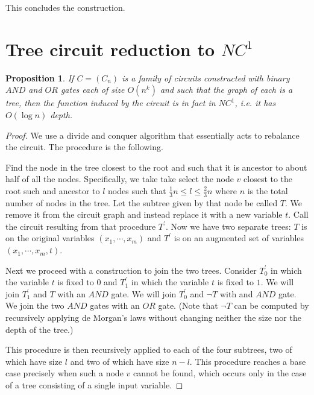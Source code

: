 \documentclass[11pt,letterpaper]{article}
\newtheorem{proposition}{Proposition}
\begin{document}
This concludes the construction.

\section{Tree circuit reduction to $NC^1$}

\begin{proposition}
    If $C = (C_n)$ is a family of circuits constructed with binary $AND$ and
    $OR$ gates each of size $O(n^k)$ and such that the graph of each is a tree,
    then the function induced by the circuit is in fact in $NC^1$, i.e. it has
    $O(\log n)$ depth.
\end{proposition}

\begin{proof}
    We use a divide and conquer algorithm that essentially acts to rebalance
    the circuit. The procedure is the following.

    Find the node in the tree closest to the root and such that it is ancestor
    to about half of all the nodes. Specifically, we take take select the node
    $v$ closest to the root such and ancestor to $l$ nodes such that
    $\frac{1}{3}n \leq l \leq \frac{2}{3}n$ where $n$ is the total number of
    nodes in the tree. Let the subtree given by that node be called $T$. We
    remove it from the circuit graph and instead replace it with a new variable
    $t$. Call the circuit resulting from that procedure $T^\prime$. Now we have
    two separate trees: $T$ is on the original variables $(x_1, \cdots, x_m)$
    and $T^\prime$ is on an augmented set of variables $(x_1, \cdots, x_m, t)$.

    Next we proceed with a construction to join the two trees. Consider
    $T_0^\prime$ in which the variable $t$ is fixed to $0$ and $T_1^\prime$ in
    which the variable $t$ is fixed to $1$. We will join $T_1^\prime$ and $T$
    with an $AND$ gate. We will join $T_0^\prime$ and $\neg T$ with and $AND$
    gate. We join the two $AND$ gates with an $OR$ gate. (Note that $\neg T$
    can be computed by recursively applying de Morgan's laws without changing
    neither the size nor the depth of the tree.)

    This procedure is then recursively applied to each of the four subtrees,
    two of which have size $l$ and two of which have size $n - l$. This
    procedure reaches a base case precisely when such a node $v$ cannot be
    found, which occurs only in the case of a tree consisting of a single input
    variable.


\end{proof}
\end{document}
